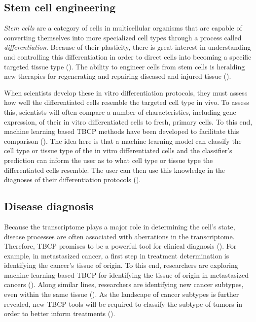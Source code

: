 \subsection{Stem cell engineering}

\textit{Stem cells} are a category of cells in multicellular organisms that are capable of converting themselves into more specialized cell types through a process called \textit{differentiation}.  Because of their plasticity, there is great interest in understanding and controlling this differentiation in order to direct cells into becoming a specific targeted tissue type (\citealp{Tewary2018}).  The ability to engineer cells from stem cells is heralding new therapies for regenerating and repairing diseased and injured tissue (\citealp{DeLuca2019}).  

When scientists develop these in vitro differentiation protocols, they must assess how well the differentiated cells resemble the targeted cell type in vivo. To assess this, scientists will often compare a number of characteristics, including gene expression, of their in vitro differentiated cells to fresh, primary cells. To this end, machine learning based TBCP methods have been developed to facilitate this comparison (\citealp{Roost2015, Cahan}).  The idea here is that a machine learning model can classify the cell type or tissue type of the in vitro differentiated cells and the classifier's prediction can inform the user as to what cell type or tissue type the differentiated cells resemble.  The user can then use this knowledge in the diagnoses of their differentiation protocols (\citealp{Morris2014}).
 
\subsection{Disease diagnosis}

Because the transcriptome plays a major role in determining the cell's state, disease processes are often associated with aberrations in the transcriptome.  Therefore, TBCP promises to be a powerful tool for clinical diagnosis (\citealp{Bryon2016}).  For example, in metastasized cancer, a first step in treatment determination is identifying the cancer's tissue of origin. To this end, researchers are exploring machine learning-based TBCP for identifying the tissue of origin in metastasized cancers (\citealp{Sun2018, Li2017}). Along similar lines, researchers are identifying new cancer subtypes, even within the same tissue (\citealp{Hoadley2018}). As the landscape of cancer subtypes is further revealed, new TBCP tools will be required to classify the subtype of tumors in order to better inform treatments (\citealp{Saddiki2015}).   

